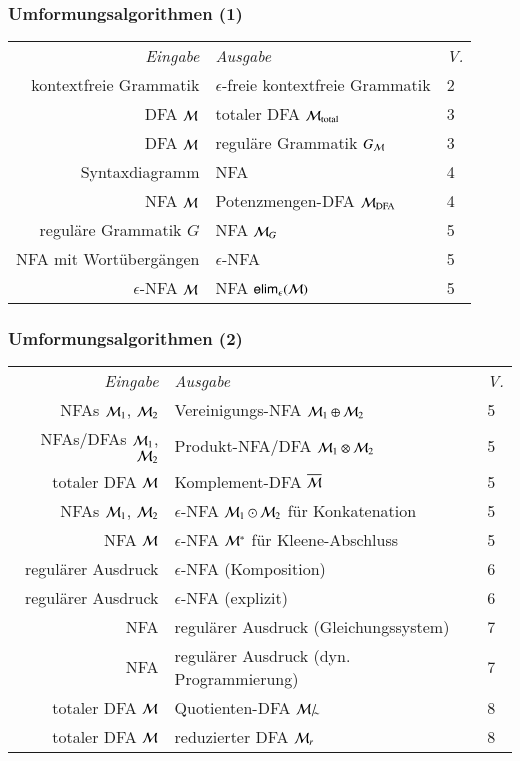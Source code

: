 \documentclass[aspectratio=1610,onlymath]{beamer}
\begin{document}
\begin{frame}[fragile]

\end{frame}

\newcommand{\simquot}[1]{#1/_{\!\!{\sim}}}

\begin{frame}\frametitle{Umformungsalgorithmen (1)}

\begin{tabular}{@{}rll@{}}
\emph{Eingabe} & \emph{Ausgabe} & \emph{V.} \\
kontextfreie Grammatik & $\epsilon$-freie kontextfreie Grammatik & 2\\
DFA $\mathcal{M}$ & totaler DFA $\mathcal{M}_{\text{total}}$ & 3\\
DFA $\mathcal{M}$ & reguläre Grammatik $G_{\mathcal{M}}$ & 3\\
Syntaxdiagramm & NFA & 4\\
NFA $\mathcal{M}$ & Potenzmengen-DFA $\mathcal{M}_{\text{DFA}}$ & 4\\
reguläre Grammatik $G$ & NFA $\mathcal{M}_G$ & 5\\
NFA mit Wortübergängen & $\epsilon$-NFA & 5\\
$\epsilon$-NFA $\mathcal{M}$ & NFA $\textsf{elim}_\epsilon(\mathcal{M})$ & 5
\end{tabular}

\end{frame}

\begin{frame}\frametitle{Umformungsalgorithmen (2)}

\begin{tabular}{@{}rll@{}}
\emph{Eingabe} & \emph{Ausgabe} & \emph{V.} \\
NFAs $\mathcal{M}_1$, $\mathcal{M}_2$ & Vereinigungs-NFA $\mathcal{M}_1\oplus\mathcal{M}_2$ & 5\\
NFAs/DFAs $\mathcal{M}_1$, $\mathcal{M}_2$ & Produkt-NFA/DFA $\mathcal{M}_1\otimes\mathcal{M}_2$ & 5\\
totaler DFA $\mathcal{M}$ & Komplement-DFA $\overline{\mathcal{M}}$ & 5\\
NFAs $\mathcal{M}_1$, $\mathcal{M}_2$ & $\epsilon$-NFA $\mathcal{M}_1\odot\mathcal{M}_2$ für Konkatenation & 5\\
NFA $\mathcal{M}$ & $\epsilon$-NFA $\mathcal{M}^*$ für Kleene-Abschluss & 5\\
regulärer Ausdruck & $\epsilon$-NFA (Komposition) & 6 \\
regulärer Ausdruck & $\epsilon$-NFA (explizit) & 6 \\
NFA & regulärer Ausdruck (Gleichungssystem) & 7 \\
NFA & regulärer Ausdruck (dyn. Programmierung) & 7 \\
totaler DFA $\mathcal{M}$ & Quotienten-DFA $\simquot{\Smach{M}}$ & 8 \\
totaler DFA $\mathcal{M}$ & reduzierter DFA $\mathcal{M}_r$ & 8
\end{tabular}

\end{frame}
\end{document}
